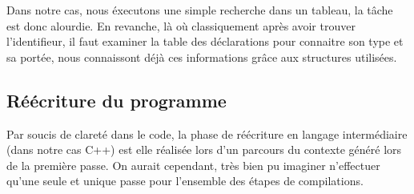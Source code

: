 Dans notre cas, nous éxecutons une simple recherche dans un tableau,
la tâche est donc alourdie. En revanche, là où classiquement après avoir 
trouver l'identifieur, il faut examiner la table des déclarations pour 
connaitre son type et sa portée, nous connaissont déjà ces informations grâce 
aux structures utilisées.

\subsection{Réécriture du programme}

Par soucis de clareté dans le code, la phase de réécriture en langage 
intermédiaire (dans notre cas C++) est elle réalisée lors d'un parcours du 
contexte généré lors de la première passe. On aurait cependant, très bien
pu imaginer n'effectuer qu'une seule et unique passe pour l'ensemble des 
étapes de compilations.


